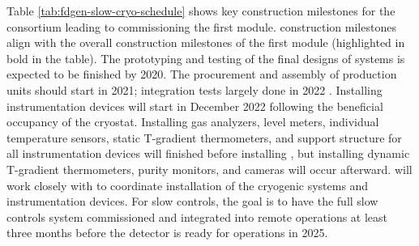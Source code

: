 
Table \ref{tab:fdgen-slow-cryo-schedule} shows key construction milestones for the  consortium leading to commissioning the first  module.  construction milestones align with the overall construction milestones of the first  module (highlighted in bold in the table). The prototyping and testing of the final designs of  systems is expected to be finished by 2020. The procurement and assembly of production units should start in 2021; integration tests largely done in 2022  . Installing instrumentation devices will start in December 2022 following the beneficial occupancy of the cryostat. Installing gas analyzers, level meters, individual temperature sensors, static T-gradient thermometers, and support structure for all instrumentation devices will finished before installing , but installing dynamic T-gradient thermometers, purity monitors, and cameras will occur afterward.  will work closely with  to coordinate installation of the cryogenic systems and instrumentation devices. For slow controls, the goal is to have the full slow controls system commissioned and integrated into remote operations at least three months before the detector is ready for operations in 2025.  

